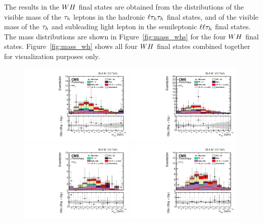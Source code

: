 The results in the $WH$ final states are obtained from the distributions of the 
visible mass of the $\tau_{h}$ leptons in the hadronic $\ell\tau_{h}\tau_{h}$ final states, 
and of the visible mass of the $\tau_{h}$ and subleading light lepton in the 
semileptonic $\ell\ell\tau_{h}$ final states. The mass distributions
are shown in Figure~\ref{fig:mass_whs} for the four $WH$ final states. 
Figure~\ref{fig:mass_wh} shows all four $WH$ final states combined together
for visualization purposes only.

\begin{figure}[h!]
 \begin{center}
  \includegraphics[width=0.49\textwidth]{higgs_to_taus_vh/plots/wh/emt_postfit.pdf}
  \includegraphics[width=0.49\textwidth]{higgs_to_taus_vh/plots/wh/mmt_postfit.pdf}
  \includegraphics[width=0.49\textwidth]{higgs_to_taus_vh/plots/wh/ett_postfit.pdf}
  \includegraphics[width=0.49\textwidth]{higgs_to_taus_vh/plots/wh/mtt_postfit.pdf}

\end{center}
\end{figure}
